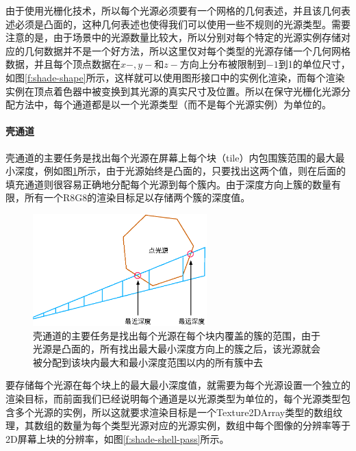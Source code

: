 由于使用光栅化技术，所以每个光源必须要有一个网格的几何表述，并且该几何表述必须是凸面的，这种几何表述也使得我们可以使用一些不规则的光源类型。需要注意的是，由于场景中的光源数量比较大，所以分别对每个特定的光源实例存储对应的几何数据并不是一个好方法，所以这里仅对每个类型的光源存储一个几何网格数据，并且每个顶点数据在$x-,y-$和$z-$方向上分布被限制到$-1$到1的单位尺寸，如图\ref{f:shade-shape}所示，这样就可以使用图形接口中的实例化渲染，而每个渲染实例在顶点着色器中被变换到其光源的真实尺寸及位置。所以在保守光栅化光源分配方法中，每个通道都是以一个光源类型（而不是每个光源实例）为单位的。






\paragraph{壳通道}
壳通道的主要任务是找出每个光源在屏幕上每个块（tile）内包围簇范围的最大最小深度，例如图\ref{f:shade-tile-shell-pass}所示，由于光源始终是凸面的，只要找出这两个值，则在后面的填充通道则很容易正确地分配每个光源到每个簇内。由于深度方向上簇的数量有限，所有一个R8G8的渲染目标足以存储两个簇的深度值。

\begin{figure}
	\sidecaption
	\includegraphics[width=0.6\textwidth]{figures/shade/tile-shell-pass}
	\caption{壳通道的主要任务是找出每个光源在每个块内覆盖的簇的范围，由于光源是凸面的，所有找出最大最小深度方向上的簇之后，该光源就会被分配到该块内最大和最小深度范围以内的所有簇中去}
	\label{f:shade-tile-shell-pass}
\end{figure}

要存储每个光源在每个块上的最大最小深度值，就需要为每个光源设置一个独立的渲染目标，而前面我们已经说明每个通道是以光源类型为单位的，每个光源类型包含多个光源的实例，所以这就要求渲染目标是一个Texture2DArray类型的数组纹理，其数组的数量为每个类型光源对应的光源实例，数组中每个图像的分辨率等于2D屏幕上块的分辨率，如图\ref{f:shade-shell-pass}所示。

